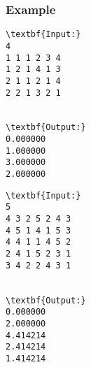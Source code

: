 \subsubsection{Example}
\begin{verbatim}
\textbf{Input:}
4
1 1 1 2 3 4
1 2 1 4 1 3
2 1 1 2 1 4
2 2 1 3 2 1


\textbf{Output:}
0.000000
1.000000
3.000000
2.000000

\end{verbatim}
\begin{verbatim}
\textbf{Input:}
5
4 3 2 5 2 4 3
4 5 1 4 1 5 3
4 4 1 1 4 5 2
2 4 1 5 2 3 1
3 4 2 2 4 3 1


\textbf{Output:}
0.000000
2.000000
4.414214
2.414214
1.414214

\end{verbatim}

\subsubsection{ }

 